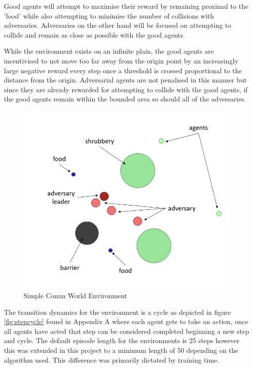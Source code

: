 \documentclass{article}
\begin{document}
Good agents will attempt to maximise their reward by remaining proximal to the 'food' while also attempting to minimise the number of collisions with adversaries.
Adversaries on the other hand will be focused on attempting to collide and remain as close as possible with the good agents.

While the environment exists on an infinite plain, the good agents are incentivised to not move too far away from the origin point by an increasingly large negative reward every step once a threshold is crossed proportional to the distance from the origin.
Adversarial agents are not penalised in this manner but since they are already rewarded for attempting to collide with the good agents, if the good agents remain within the bounded area so should all of the adversaries.

\begin{figure}[!ht]
  \centering
  \includegraphics[scale=0.25]{simple_comm_environment.png}
  \caption{Simple Comm World Environment}
  \label{fig:simple_comm_world_2}
\end{figure}

The transition dynamics for the environment is a cycle as depicted in figure \ref{fig:stepcycle} found in Appendix A where each agent gets to take an action, once all agents have acted that step can be considered completed beginning a new step and cycle.
The default episode length for the environments is 25 steps however this was extended in this project to a minimum length of 50 depending on the algorithm used. 
This difference was primarily dictated by training time.
\end{document}
